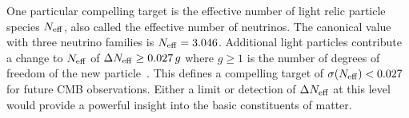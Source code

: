 

One particular compelling target is the effective number of light relic particle species ${N_{\rm eff}}$, also called the effective 
number of neutrinos. The canonical value with three neutrino families is ${N_{\rm eff}} = 3.046$. Additional light particles 
contribute a change to ${N_{\rm eff}}$ of $\Delta {N_{\rm eff}} \geq 0.027\,g$ where $g \geq 1$ is the number of 
degrees of freedom of the new particle~\cite{Brust:2013xpv,Baumann:2016wac}.  
This defines a compelling target of $\sigma({N_{\rm eff}}) < 0.027$ for future CMB observations. 
Either a limit or detection of $\Delta {N_{\rm eff}}$ at this level would provide a powerful insight into the basic constituents 
of matter. 


